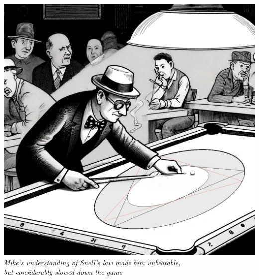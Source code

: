 \vspace{2em}
\begin{center}
    \includegraphics[height=10\baselineskip]{07_BilliardsConicsPorism/BILLIARDS.png}\\
    {\small\textit{Mike's understanding of Snell's law made him unbeatable,\\ but considerably slowed down the game}}
\end{center}
